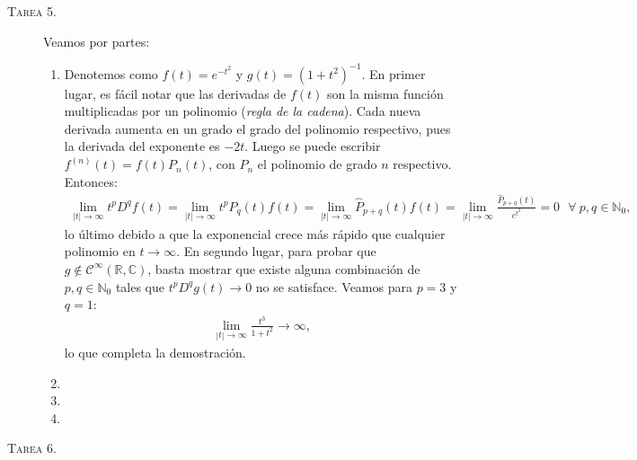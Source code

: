 \documentclass[spanish, fleqn]{article}
\begin{document}
\begin{description}
	\item[\textsc{Tarea 5.}] Veamos por partes:
	\begin{enumerate}
		\item Denotemos como $\displaystyle f(t)=e^{-t^2}$ y $\displaystyle g(t)=(1+t^2)^{-1}$. En primer lugar, es fácil notar que las derivadas de $f(t)$ son la misma función multiplicadas por un polinomio (\textit{regla de la cadena}). Cada nueva derivada aumenta en un grado el grado del polinomio respectivo, pues la derivada del exponente es $-2t$.
		Luego se puede escribir $f^{(n)}(t)=f(t)P_n(t)$, con $P_n$ el polinomio de grado $n$ respectivo. Entonces:
		\begin{align*}
			\lim_{|t|\rightarrow \infty} t^p D^q f(t) = \lim_{|t|\rightarrow \infty} t^p P_q(t) f(t) = \lim_{|t|\rightarrow \infty} \widehat{P}_{p+q}(t) f(t) = \lim_{|t|\rightarrow \infty} \frac{\widehat{P}_{p+q}(t)}{e^{t^2}} = 0 \ \ \ \forall \ p,q \in \mathbb{N}_0,
		\end{align*}
		lo último debido a que la exponencial crece más rápido que cualquier polinomio en $t \rightarrow \infty$. En segundo lugar, para probar que $g \notin \mathcal{C}^{\infty}(\mathbb{R},\mathbb{C})$, basta mostrar que existe alguna combinación de $p,q \in \mathbb{N}_0$ tales que $t^p D^q g(t) \rightarrow 0$ no se satisface. Veamos para $p=3$ y $q=1$:
		\begin{align*}
			\lim_{|t|\rightarrow \infty} \frac{t^3}{1+t^2} \rightarrow \infty,
		\end{align*}
		lo que completa la demostración.

		\item

		\item

		\item
	\end{enumerate}




	\item[\textsc{Tarea 6.}]




\end{description}
\end{document}
